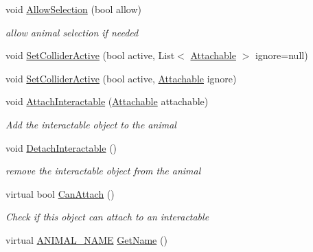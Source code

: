 \begin{DoxyCompactItemize}
void \mbox{\hyperlink{class_animal_ac8b6cc0e6eb0a6cb509cf4d562745e36}{Allow\+Selection}} (bool allow)
\begin{DoxyCompactList}\small\item\em allow animal selection if needed \end{DoxyCompactList}\item 
void \mbox{\hyperlink{class_animal_a7b30268c3ad4feb7b84107e195eaac28}{Set\+Collider\+Active}} (bool active, List$<$ \mbox{\hyperlink{class_attachable}{Attachable}} $>$ ignore=null)
\item 
void \mbox{\hyperlink{class_animal_a2f02116126d2fddd5938a5f3b9b163d1}{Set\+Collider\+Active}} (bool active, \mbox{\hyperlink{class_attachable}{Attachable}} ignore)
\item 
void \mbox{\hyperlink{class_animal_a2ca4f870282a91496124d13b351e8415}{Attach\+Interactable}} (\mbox{\hyperlink{class_attachable}{Attachable}} attachable)
\begin{DoxyCompactList}\small\item\em Add the interactable object to the animal \end{DoxyCompactList}\item 
void \mbox{\hyperlink{class_animal_a70c9a4ffd82a76ec8665f99646858399}{Detach\+Interactable}} ()
\begin{DoxyCompactList}\small\item\em remove the interactable object from the animal \end{DoxyCompactList}\item 
virtual bool \mbox{\hyperlink{class_animal_a4809045a8807c4b2e0d7569b806740ee}{Can\+Attach}} ()
\begin{DoxyCompactList}\small\item\em Check if this object can attach to an interactable \end{DoxyCompactList}\item 
virtual \mbox{\hyperlink{_animal_8cs_a2fa5713399b84d1b88dae9196837af50}{A\+N\+I\+M\+A\+L\+\_\+\+N\+A\+ME}} \mbox{\hyperlink{class_animal_ab66ea3e3cb15a2b236ba9ba4d589ca69}{Get\+Name}} ()
\end{DoxyCompactItemize}
